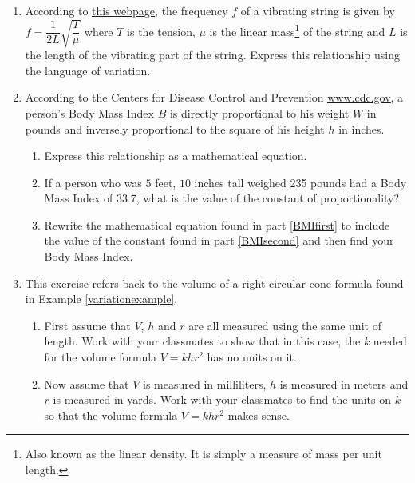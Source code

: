 \documentclass{ximera}
\begin{document}
\begin{enumerate}
\setcounter{enumi}{\value{HW}}

\item According to \href{http://en.wikipedia.org/wiki/Vibrating_string}{\underline{this webpage}}, the frequency $f$ of a vibrating string is given by $f = \dfrac{1}{2L} \sqrt{\dfrac{T}{\mu}}$ where $T$ is the tension, $\mu$ is the linear mass\footnote{Also known as the linear density.  It is simply a measure of mass per unit length.} of the string and $L$ is the length of the vibrating part of the string.  Express this relationship using the language of variation.

\item According to the Centers for Disease Control and Prevention \href{http://www.cdc.gov}{\underline{www.cdc.gov}}, a person's Body Mass Index $B$ is directly proportional to his weight $W$ in pounds and inversely proportional to the square of his height $h$ in inches. 

\begin{enumerate}

\item Express this relationship as a mathematical equation. \label{BMIfirst} 
\item If a person who was $5$ feet, $10$ inches tall weighed 235 pounds had a Body Mass Index of 33.7, what is the value of the constant of proportionality? \label{BMIsecond}
\item Rewrite the mathematical equation found in part \ref{BMIfirst} to include the value of the constant found in part \ref{BMIsecond} and then find your Body Mass Index.

\end{enumerate}

\item This exercise refers back to the volume of a right circular cone formula found in Example \ref{variationexample}.  

\begin{enumerate}

\item \label{coneexercisenounits} First assume that $V$, $h$ and $r$ are all measured using the same unit of length.  Work with your classmates to show that in this case, the $k$ needed for the volume formula $V = k h r^{2}$ has no units on it.

\item \label{coneexercisebadunits} Now assume that $V$ is measured in milliliters, $h$ is measured in meters and $r$ is measured in yards.  Work with your classmates to find the units on $k$ so that the volume formula $V = k h r^{2}$ makes sense.


\end{enumerate}
\end{enumerate}
\end{document}
